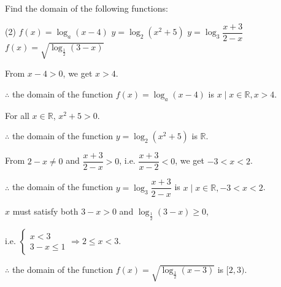 \documentclass{report}
\begin{document}
        \begin{question}
            Find the domain of the following functions:
            \begin{tasks}[label=(\alph*)](2)
                \task $f(x)=\log _a(x-4)$
                \task $y=\log _2\left(x^2+5\right)$
                \task $y=\log _3 \dfrac{x+3}{2-x}$
                \task $f(x)=\sqrt{\log _{\frac{1}{2}}(3-x)}$
            \end{tasks}

            \sol{}
            \begin{tasks}[label=(\alph*)]
                \task From $x-4>0$, we get $x>4$. 
                
                $\therefore$ the domain of the function $f(x)=\log _a(x-4)$ is ${x \mid x \in \mathbb{R}, x>4}$.

                \task For all $x \in \mathbb{R}$, $x^2+5>0$. 
                
                $\therefore$ the domain of the function $y=\log _2\left(x^2+5\right)$ is $\mathbb{R}$.
                
                \task From $2-x \neq 0$ and $\dfrac{x+3}{2-x}>0$, i.e. $\dfrac{x+3}{x-2}<0$, we get $-3<x<2$. 
                
                $\therefore$ the domain of the function $y=\log _3 \dfrac{x+3}{2-x}$ is ${x \mid x \in \mathbb{R}, -3<x<2}$.
                
                \task $x$ must satisfy both $3-x>0$ and $\log _{\frac{1}{2}}(3-x) \geq 0$, 
                
                i.e. $\left\{\begin{array}{c}x<3 \\ 3-x \leq 1\end{array} \Rightarrow 2 \leq x<3\right.$. 
                
                $\therefore$ the domain of the function $f(x)=\sqrt{\log _{\frac{1}{2}}(x-3)}$ is $[2,3)$.
            \end{tasks}
        \end{question}
\end{document}

